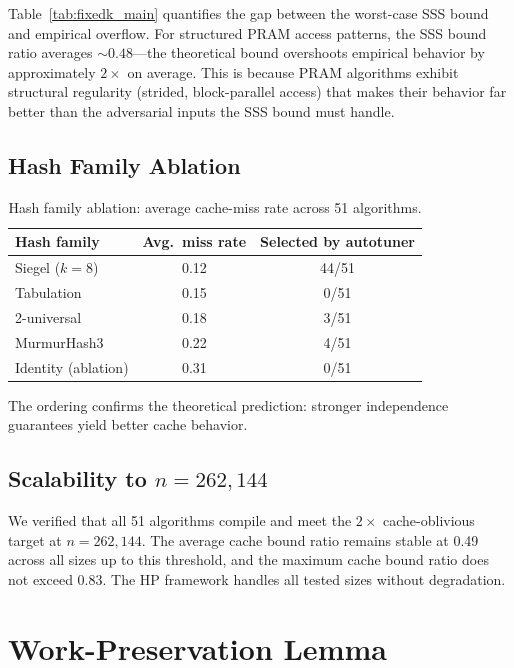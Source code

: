 \documentclass[11pt]{article}
\begin{document}
Table~\ref{tab:fixedk_main} quantifies the gap between the worst-case
SSS bound and empirical overflow.  For structured PRAM access patterns,
the SSS bound ratio averages ${\sim}0.48$---the theoretical bound
overshoots empirical behavior by approximately $2\times$ on average.
This is because PRAM algorithms exhibit structural regularity (strided,
block-parallel access) that makes their behavior far better than the
adversarial inputs the SSS bound must handle.

\subsection{Hash Family Ablation}

\begin{table}[t]
\centering
\caption{Hash family ablation: average cache-miss rate across 51 algorithms.}
\label{tab:hash}
\begin{tabular}{@{}lcc@{}}
\toprule
\textbf{Hash family} & \textbf{Avg.\ miss rate} & \textbf{Selected by autotuner} \\
\midrule
Siegel ($k = 8$) & 0.12 & 44/51 \\
Tabulation~\cite{patrascu2012power} & 0.15 & 0/51 \\
2-universal & 0.18 & 3/51 \\
MurmurHash3 & 0.22 & 4/51 \\
Identity (ablation) & 0.31 & 0/51 \\
\bottomrule
\end{tabular}
\end{table}

The ordering confirms the theoretical prediction: stronger independence
guarantees yield better cache behavior.

\subsection{Scalability to $n = 262{,}144$}

We verified that all 51 algorithms compile and meet the $2\times$
cache-oblivious target at $n = 262{,}144$.  The average cache bound
ratio remains stable at 0.49 across all sizes up to this threshold,
and the maximum cache bound ratio does not exceed 0.83.  The HP
framework handles all tested sizes without degradation.

\section{Work-Preservation Lemma}
\label{sec:work}
\end{document}
